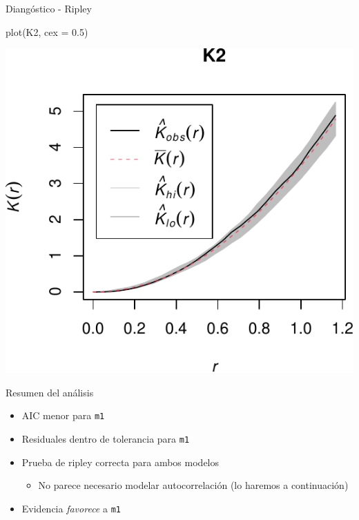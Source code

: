 \documentclass[
  11pt,
  ignorenonframetext,
]{beamer}
\newenvironment{Shaded}{}{}
\newcommand{\AttributeTok}[1]{\textcolor[rgb]{0.49,0.56,0.16}{#1}}
\newcommand{\FloatTok}[1]{\textcolor[rgb]{0.25,0.63,0.44}{#1}}
\newcommand{\FunctionTok}[1]{\textcolor[rgb]{0.02,0.16,0.49}{#1}}
\newcommand{\NormalTok}[1]{#1}
\providecommand{\tightlist}{%
  \setlength{\itemsep}{0pt}\setlength{\parskip}{0pt}}
\begin{document}
\begin{frame}[fragile]{Diangóstico - Ripley}
\protect\hypertarget{dianguxf3stico---ripley}{}
\begin{Shaded}
\begin{Highlighting}[]
\FunctionTok{plot}\NormalTok{(K2, }\AttributeTok{cex =} \FloatTok{0.5}\NormalTok{)}
\end{Highlighting}
\end{Shaded}

\begin{center}\includegraphics{Tutorial-spatstat-2_files/figure-beamer/unnamed-chunk-21-1} \end{center}
\end{frame}

\begin{frame}[fragile]{Resumen del análisis}
\protect\hypertarget{resumen-del-anuxe1lisis}{}
\begin{itemize}
\item
  AIC menor para \texttt{m1}
\item
  Residuales dentro de tolerancia para \texttt{m1}
\item
  Prueba de ripley correcta para ambos modelos

  \begin{itemize}
  \tightlist
  \item
    No parece necesario modelar autocorrelación (lo haremos a
    continuación)
  \end{itemize}
\item
  Evidencia \emph{favorece} a \texttt{m1}
\end{itemize}
\end{frame}
\end{document}
